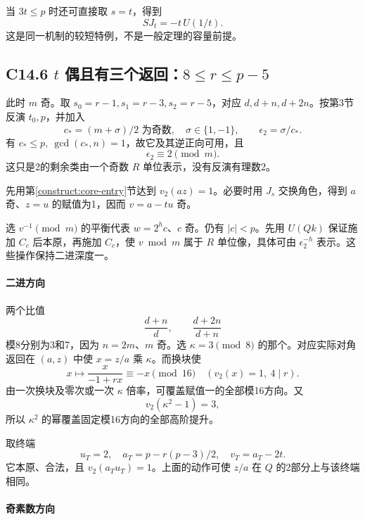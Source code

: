 {当} \(3t\le p\) {时还可直接取} \(s=t\){，得到} \[
SJ_t=-t\,U(1/t).
\] {这是同一机制的较短特例，不是一般定理的容量前提。}

\subsection*{\texorpdfstring{{C14.6} \(t\) {偶且有三个返回：}\(8\le r\le p-5\)}{C14.6 t 偶且有三个返回：8\textbackslash le r\textbackslash le p-5}}\label{C14-h98}

{此时} \(m\) {奇。取} \(s_0=r-1,s_1=r-3,s_2=r-5\){，对应} \(d,d+n,d+2n\){。按第3节反演} \(t_0,p\){，并加入} \[
c_*=(m+\sigma)/2\text{ 为奇数},\quad \sigma\in\{1,-1\},\qquad
\epsilon_2=\sigma/c_*.
\] {有} \(c_*\le p,\ \gcd(c_*,n)=1\){，故它及其逆正向可用，且} \[
\epsilon_2\equiv2\pmod m.
\] {这只是2的剩余类由一个奇数} \(R\) {单位表示，没有反演有理数2。}

{先用}第\ref{construct:core-entry}节{达到} \(v_2(az)=1\){。必要时用} \(J_s\) {交换角色，得到} \(a\) {奇、}\(z=u\) {的赋值为1，因而} \(v=a-tu\) {奇。}

{选} \(v^{-1}\pmod m\) {的平衡代表} \(w=2^h c\){、}\(c\) {奇。仍有} \(|c|<p\){。先用} \(U(Qk)\) {保证施加} \(C_c\) {后本原，再施加} \(C_c\){，使} \(v\bmod m\) {属于} \(R\) {单位像，具体可由} \(\epsilon_2^{-h}\) {表示。这些操作保持二进深度一。}

\paragraph*{\texorpdfstring{{二进方向}}{二进方向}}\label{C14-h99}

{两个比值} \[
\frac{d+n}{d},\qquad\frac{d+2n}{d+n}
\] {模8分别为3和7，因为} \(n=2m\){、}\(m\) {奇。选} \(\kappa=3\pmod8\) {的那个。对应实际对角返回在} \((a,z)\) {中使} \(x=z/a\) {乘} \(\kappa\){。而换块使} \[
x\mapsto\frac{x}{-1+rx}\equiv-x\pmod{16}
\quad(v_2(x)=1,\ 4\mid r).
\] {由一次换块及零次或一次} \(\kappa\) {倍率，可覆盖赋值一的全部模16方向。又} \[
v_2(\kappa^2-1)=3,
\] {所以} \(\kappa^2\) {的幂覆盖固定模16方向的全部高阶提升。}

{取终端} \[
u_T=2,\quad a_T=p-r(p-3)/2,\quad v_T=a_T-2t.
\tag{C14.10}
\] {它本原、合法，且} \(v_2(a_Tu_T)=1\){。上面的动作可使} \(z/a\) {在} \(Q\) {的2部分上与该终端相同。}

\paragraph*{\texorpdfstring{{奇素数方向}}{奇素数方向}}\label{C14-h100}

